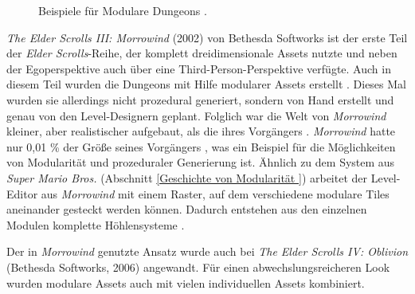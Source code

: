 \par
\begin{figure}[!h]
\centering
  \qquad
  \caption{Beispiele für Modulare Dungeons \parencite{Fallout4P}.}%
\end{figure}
\newpage
\textit{The Elder Scrolls III: Morrowind} (2002) von Bethesda Softworks ist der erste Teil der \textit{Elder Scrolls}-Reihe, der komplett dreidimensionale Assets nutzte und neben der Egoperspektive auch über eine Third-Person-Perspektive verfügte. Auch in diesem Teil wurden die Dungeons mit Hilfe modularer Assets erstellt \parencite{Fallout4}. Dieses Mal wurden sie allerdings nicht prozedural generiert, sondern von Hand erstellt und genau von den Level-Designern geplant. Folglich war die Welt von \textit{Morrowind} kleiner, aber realistischer aufgebaut, als die ihres Vorgängers \parencite{Morrowind}. \textit{Morrowind} hatte nur 0,01 \% der Größe seines Vorgängers \parencite{Daggerfall}, was ein Beispiel für die Möglichkeiten von Modularität und prozeduraler Generierung ist. Ähnlich zu dem System aus \textit{Super Mario Bros.} (Abschnitt \ref{Geschichte von Modularität }) arbeitet der Level-Editor aus \textit{Morrowind} mit einem Raster, auf dem verschiedene modulare Tiles aneinander gesteckt werden können. Dadurch entstehen aus den einzelnen Modulen komplette Höhlensysteme \parencite{Fallout4}.
\par
Der in \textit{Morrowind} genutzte Ansatz wurde auch bei \textit{The Elder Scrolls IV: Oblivion} (Bethesda Softworks, 2006) angewandt. Für einen abwechslungsreicheren Look wurden modulare Assets auch mit vielen individuellen Assets kombiniert. \parencite{Fallout4}
